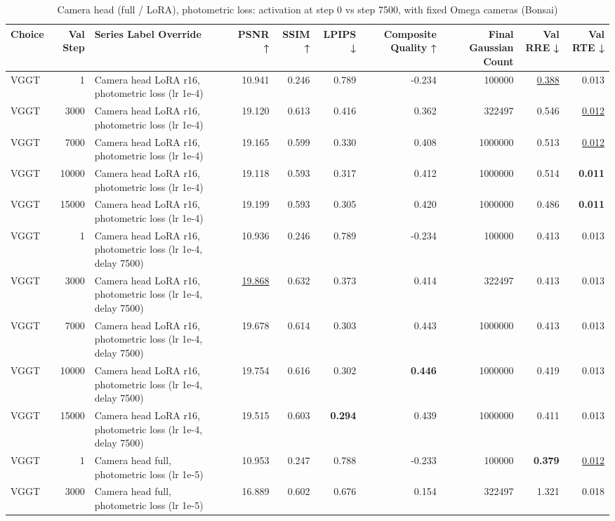 \begin{table}[H]
\caption{\ifdefined\customcaption \customcaption \else Camera head (full / LoRA), photometric loss: activation at step 0 vs step 7500, with fixed Omega cameras (Bonsai) \fi}
\label{tab:112_omega_photo_delay_heads_bonsai}
\centering
\tiny
\begin{tabular}{lrlrrrrrrr}
\toprule
Choice & Val Step & Series Label Override & PSNR ↑ & SSIM ↑ & LPIPS ↓ & Composite Quality ↑ & Final Gaussian Count & Val RRE ↓ & Val RTE ↓ \\
\midrule
VGGT & 1 & Camera head LoRA r16, photometric loss (lr 1e-4) & 10.941 & 0.246 & 0.789 & -0.234 & 100000 & \underline{0.388} & 0.013 \\
VGGT & 3000 & Camera head LoRA r16, photometric loss (lr 1e-4) & 19.120 & 0.613 & 0.416 & 0.362 & 322497 & 0.546 & \underline{0.012} \\
VGGT & 7000 & Camera head LoRA r16, photometric loss (lr 1e-4) & 19.165 & 0.599 & 0.330 & 0.408 & 1000000 & 0.513 & \underline{0.012} \\
VGGT & 10000 & Camera head LoRA r16, photometric loss (lr 1e-4) & 19.118 & 0.593 & 0.317 & 0.412 & 1000000 & 0.514 & \textbf{0.011} \\
VGGT & 15000 & Camera head LoRA r16, photometric loss (lr 1e-4) & 19.199 & 0.593 & 0.305 & 0.420 & 1000000 & 0.486 & \textbf{0.011} \\
VGGT & 1 & Camera head LoRA r16, photometric loss (lr 1e-4, delay 7500) & 10.936 & 0.246 & 0.789 & -0.234 & 100000 & 0.413 & 0.013 \\
VGGT & 3000 & Camera head LoRA r16, photometric loss (lr 1e-4, delay 7500) & \underline{19.868} & 0.632 & 0.373 & 0.414 & 322497 & 0.413 & 0.013 \\
VGGT & 7000 & Camera head LoRA r16, photometric loss (lr 1e-4, delay 7500) & 19.678 & 0.614 & 0.303 & 0.443 & 1000000 & 0.413 & 0.013 \\
VGGT & 10000 & Camera head LoRA r16, photometric loss (lr 1e-4, delay 7500) & 19.754 & 0.616 & 0.302 & \textbf{0.446} & 1000000 & 0.419 & 0.013 \\
VGGT & 15000 & Camera head LoRA r16, photometric loss (lr 1e-4, delay 7500) & 19.515 & 0.603 & \textbf{0.294} & 0.439 & 1000000 & 0.411 & 0.013 \\
VGGT & 1 & Camera head full, photometric loss (lr 1e-5) & 10.953 & 0.247 & 0.788 & -0.233 & 100000 & \textbf{0.379} & \underline{0.012} \\
VGGT & 3000 & Camera head full, photometric loss (lr 1e-5) & 16.889 & 0.602 & 0.676 & 0.154 & 322497 & 1.321 & 0.018 \\

\end{tabular}
\end{table}
